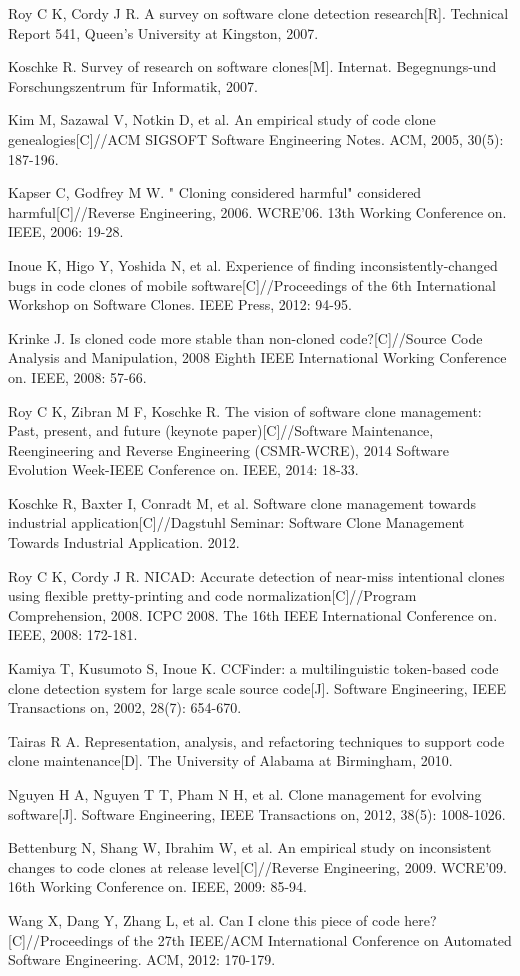 \documentclass[twoside]{article}
\def\REF#1{\par\hangindent\parindent\indent\llap{#1\enspace}\ignorespaces}
\begin{document}
\begin{multicols}{2}
\REF{[1]} Roy C K, Cordy J R. A survey on software clone detection research[R]. Technical Report 541, Queen's University at Kingston, 2007. 
\REF{[2]} Koschke R. Survey of research on software clones[M]. Internat. Begegnungs-und Forschungszentrum f\"{u}r Informatik, 2007.
\REF{[3]} Kim M, Sazawal V, Notkin D, et al. An empirical study of code clone genealogies[C]//ACM SIGSOFT Software Engineering Notes. ACM, 2005, 30(5): 187-196.
\REF{[4]} Kapser C, Godfrey M W. " Cloning considered harmful" considered harmful[C]//Reverse Engineering, 2006. WCRE'06. 13th Working Conference on. IEEE, 2006: 19-28.
\REF{[5]} Inoue K, Higo Y, Yoshida N, et al. Experience of finding inconsistently-changed bugs in code clones of mobile software[C]//Proceedings of the 6th International Workshop on Software Clones. IEEE Press, 2012: 94-95.
\REF{[6]} Krinke J. Is cloned code more stable than non-cloned code?[C]//Source Code Analysis and Manipulation, 2008 Eighth IEEE International Working Conference on. IEEE, 2008: 57-66.
\REF{[7]} Roy C K, Zibran M F, Koschke R. The vision of software clone management: Past, present, and future (keynote paper)[C]//Software Maintenance, Reengineering and Reverse Engineering (CSMR-WCRE), 2014 Software Evolution Week-IEEE Conference on. IEEE, 2014: 18-33.
\REF{[8]} Koschke R, Baxter I, Conradt M, et al. Software clone management towards industrial application[C]//Dagstuhl Seminar: Software Clone Management Towards Industrial Application. 2012.
\REF{[9]} Roy C K, Cordy J R. NICAD: Accurate detection of near-miss intentional clones using flexible pretty-printing and code normalization[C]//Program Comprehension, 2008. ICPC 2008. The 16th IEEE International Conference on. IEEE, 2008: 172-181.
\REF{[10]} Kamiya T, Kusumoto S, Inoue K. CCFinder: a multilinguistic token-based code clone detection system for large scale source code[J]. Software Engineering, IEEE Transactions on, 2002, 28(7): 654-670.
\REF{[11]} Tairas R A. Representation, analysis, and refactoring techniques to support code clone maintenance[D]. The University of Alabama at Birmingham, 2010.
\REF{[12]} Nguyen H A, Nguyen T T, Pham N H, et al. Clone management for evolving software[J]. Software Engineering, IEEE Transactions on, 2012, 38(5): 1008-1026.
\REF{[13]} Bettenburg N, Shang W, Ibrahim W, et al. An empirical study on inconsistent changes to code clones at release level[C]//Reverse Engineering, 2009. WCRE'09. 16th Working Conference on. IEEE, 2009: 85-94.
\REF{[14]} Wang X, Dang Y, Zhang L, et al. Can I clone this piece of code here?[C]//Proceedings of the 27th IEEE/ACM International Conference on Automated Software Engineering. ACM, 2012: 170-179.

\end{multicols}
\end{document}
